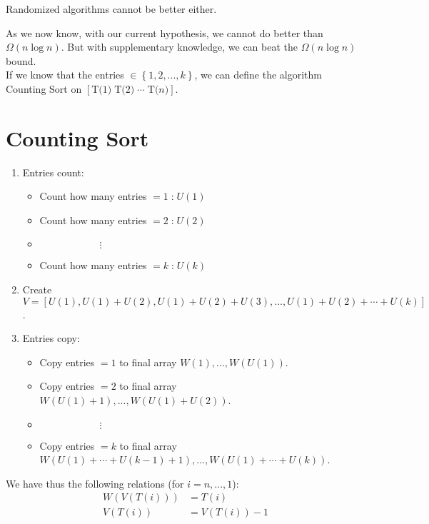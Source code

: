 \begin{remark} Randomized algorithms cannot be better either. \end{remark}

As we now know, with our current hypothesis, we cannot do better than $\Omega (n\log n)$. But with supplementary knowledge, we can beat the $\Omega (n\log n)$ bound.\\

If we know that the entries $\in \left\{ 1,2,...,k \right\}$, we can define the algorithm Counting Sort on $\left[ \text{T(1)} \; \text{T(2)} \; \cdots \; \text{T(}n\text{)} \right]$.

\section{Counting Sort}
\begin{enumerate}
\item Entries count:
\begin{itemize} 
	\item Count how many entries $=1 \;$:$\; U(1)$
	\item Count how many entries $=2 \;$:$\; U(2)$
	\item $\qquad \qquad \qquad \vdots$
	\item Count how many entries $=k \;$:$\; U(k)$
	\end{itemize}
\item Create $V = \left[ U(1), U(1)+U(2), U(1)+U(2)+U(3), ..., U(1)+U(2)+\cdots+U(k) \right]$.
\item Entries copy:
\begin{itemize} 
	\item Copy entries $=1$ to final array $W(1),...,W(U(1))$.
	\item Copy entries $=2$ to final array $W(U(1)+1),...,W(U(1)+U(2))$.
	\item $\qquad \qquad \qquad \vdots$
	\item Copy entries $=k$ to final array $W(U(1)+\cdots+U(k-1)+1),...,W(U(1)+\cdots+U(k))$.
	\end{itemize}
\end{enumerate}
We have thus the following relations (for $i=n,...,1$):
\begin{align*}
W(V(T(i))) & = T(i) \\
V(T(i)) & = V(T(i)) - 1
\end{align*}

